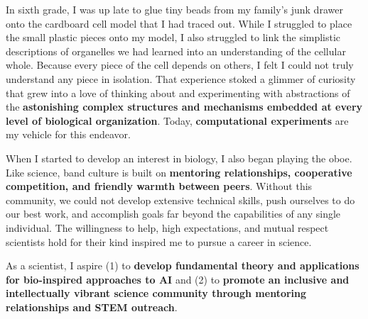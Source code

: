 In sixth grade, I was up late to glue tiny beads from my family's junk drawer onto the cardboard cell model that I had traced out.
While I struggled to place the small plastic pieces onto my model, I also struggled to link the simplistic descriptions of organelles we had learned into an understanding of the cellular whole.
Because every piece of the cell depends on others, I felt I could not truly understand any piece in isolation.
That experience stoked a glimmer of curiosity that grew into a love of thinking about and experimenting with abstractions of the \textbf{astonishing complex structures and mechanisms embedded at every level of biological organization}.
Today, \textbf{computational experiments} are my vehicle for this endeavor.

When I started to develop an interest in biology, I also began playing the oboe.
Like science, band culture is built on \textbf{mentoring relationships, cooperative competition, and friendly warmth between peers}.
Without this community, we could not develop extensive technical skills, push ourselves to do our best work, and accomplish goals far beyond the capabilities of any single individual.
The willingness to help, high expectations, and mutual respect scientists hold for their kind inspired me to pursue a career in science.

As a scientist, I aspire
(1) to \textbf{develop fundamental theory and applications for bio-inspired approaches to AI} and
(2) to \textbf{promote an inclusive and intellectually vibrant science community through mentoring relationships and STEM outreach}.
